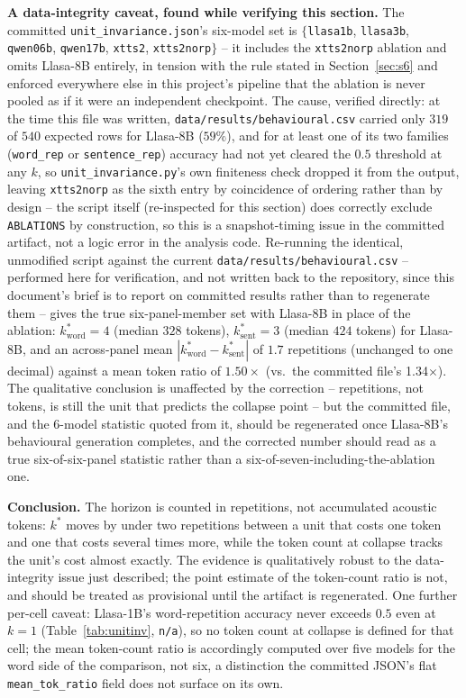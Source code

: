 \documentclass[11pt]{article}
\begin{document}
\textbf{A data-integrity caveat, found while verifying this section.} The
committed \texttt{unit\_invariance.json}'s six-model set is
$\{$\texttt{llasa1b}, \texttt{llasa3b}, \texttt{qwen06b}, \texttt{qwen17b},
\texttt{xtts2}, \texttt{xtts2norp}$\}$ -- it includes the \texttt{xtts2norp}
ablation and omits Llasa-8B entirely, in tension with the rule stated in
Section~\ref{sec:s6} and enforced everywhere else in this project's pipeline
that the ablation is never pooled as if it were an independent checkpoint. The
cause, verified directly: at the time this file was written,
\texttt{data/results/behavioural.csv} carried only $319$ of $540$ expected
rows for Llasa-8B ($59\%$), and for at least one of its two families
(\texttt{word\_rep} or \texttt{sentence\_rep}) accuracy had not yet cleared the
$0.5$ threshold at any $k$, so \texttt{unit\_invariance.py}'s own finiteness
check dropped it from the output, leaving \texttt{xtts2norp} as the sixth
entry by coincidence of ordering rather than by design -- the script itself
(re-inspected for this section) does correctly exclude \texttt{ABLATIONS} by
construction, so this is a snapshot-timing issue in the committed artifact,
not a logic error in the analysis code. Re-running the identical, unmodified
script against the current \texttt{data/results/behavioural.csv} -- performed
here for verification, and not written back to the repository, since this
document's brief is to report on committed results rather than to regenerate
them -- gives the true six-panel-member set with Llasa-8B in place of the
ablation: $k^\ast_{\mathrm{word}}{=}4$ (median $328$ tokens),
$k^\ast_{\mathrm{sent}}{=}3$ (median $424$ tokens) for Llasa-8B, and an
across-panel mean $|k^\ast_{\mathrm{word}}-k^\ast_{\mathrm{sent}}|$ of $1.7$
repetitions (unchanged to one decimal) against a mean token ratio of
$1.50\times$ (vs.\ the committed file's 1.34$\times$). The
qualitative conclusion is unaffected by the correction -- repetitions, not
tokens, is still the unit that predicts the collapse point -- but the
committed file, and the 6-model statistic quoted from it, should be
regenerated once Llasa-8B's behavioural generation
completes, and the corrected number should read as a true six-of-six-panel
statistic rather than a six-of-seven-including-the-ablation one.

\textbf{Conclusion.} The horizon is counted in repetitions, not accumulated
acoustic tokens: $k^\ast$ moves by under two repetitions between a unit that
costs one token and one that costs several times more, while the token count
at collapse tracks the unit's cost almost exactly. The evidence is
qualitatively robust to the data-integrity issue just described; the point
estimate of the token-count ratio is not, and should be treated as
provisional until the artifact is regenerated. One further per-cell caveat:
Llasa-1B's word-repetition accuracy never exceeds $0.5$ even at $k{=}1$
(Table~\ref{tab:unitinv}, \texttt{n/a}), so no token count at collapse is
defined for that cell; the mean token-count ratio is accordingly computed over
five models for the word side of the comparison, not six, a distinction the
committed JSON's flat \texttt{mean\_tok\_ratio} field does not surface on its
own.
\end{document}
